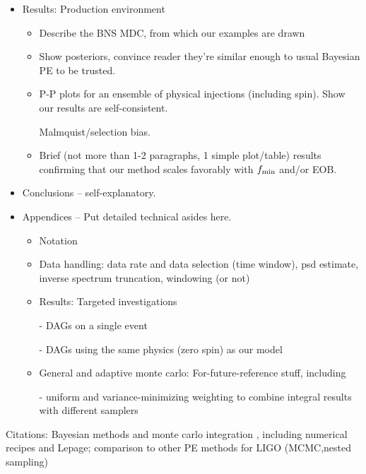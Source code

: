 \documentclass[twocolumn,prd,nofootinbib]{revtex4}
\begin{document}
{\begin{widetext}
\begin{itemize}
\begin{itemize}
	\end{itemize}

\item Results: Production environment
	\begin{itemize}
          \item Describe the BNS MDC, from which our examples are drawn
	\item Show posteriors, convince reader they're similar enough to usual Bayesian PE to be trusted.
	\item P-P plots for an ensemble of physical injections (including spin). Show our results are self-consistent.

          Malmquist/selection bias.  
	\item Brief (not more than 1-2 paragraphs, 1 simple plot/table) results confirming 
		that our method scales favorably with $f_{\rm min}$ and/or EOB. 
	\end{itemize}

\item Conclusions -- self-explanatory.

\item Appendices -- Put detailed technical asides here.

  \begin{itemize}
    \item Notation
    \item Data handling: data rate and data selection (time window), psd estimate, inverse spectrum truncation,
      windowing (or not)
  \item Results: Targeted investigations

  -    DAGs on a single event

  - DAGs using the same physics (zero spin) as our model


  \item General and adaptive monte carlo: For-future-reference stuff, including

    - uniform and variance-minimizing weighting to combine integral results with different samplers

  \end{itemize}

\end{itemize}

Citations: Bayesian methods and monte carlo integration \cite{2011RvMP...83..943V}, including numerical recipes and Lepage; comparison
to other PE methods for LIGO
(MCMC,nested sampling) \cite{LIGO-CBC-S6-PE,2011PhRvD..83h2002D,2011PhRvD..84f2003C,gr-extensions-tests-Europeans2011,gwastro-mergers-PE-Aylott-LIGOATest,2011ApJ...739...99N,2012PhRvD..85j4045V,gw-astro-PE-Raymond,gw-astro-PE-lalinference-v1}

\tableofcontents

\end{widetext}
}
\end{document}
